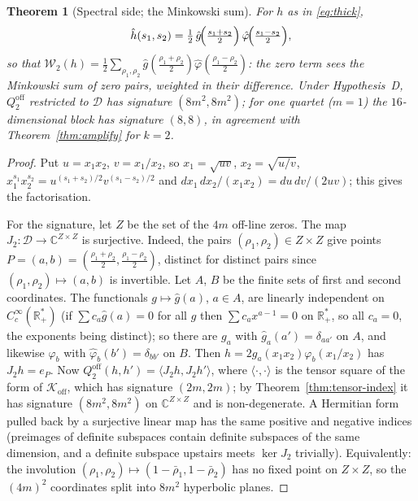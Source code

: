 \documentclass[11pt]{amsart}
\newtheorem{theorem}{Theorem}[section]
\theoremstyle{definition}
\theoremstyle{remark}
\newcommand{\bbR}{\mathbb{R}}
\newcommand{\bbC}{\mathbb{C}}
\newcommand{\Rp}{\bbR_+^*}
\newcommand{\Koff}{\mathcal{K}_{\mathrm{off}}}
\newcommand{\Wtwo}{\mathcal{W}_2}
\begin{document}
\begin{theorem}[Spectral side; the Minkowski sum]\label{thm:signature}
For $h$ as in \eqref{eq:thick},
\[
\hat h(s_1,s_2)=\tfrac12\,\hat g\!\Bigl(\tfrac{s_1+s_2}{2}\Bigr)\,
\hat\varphi\!\Bigl(\tfrac{s_1-s_2}{2}\Bigr),
\]
so that $\Wtwo(h)=\tfrac12\sum_{\rho_1,\rho_2}\hat g(\tfrac{\rho_1+\rho_2}{2})
\hat\varphi(\tfrac{\rho_1-\rho_2}{2})$: the zero term sees the Minkowski sum of zero pairs,
weighted in their difference. Under Hypothesis~D, $Q_2^{\mathrm{off}}$ restricted to
$\mathcal D$ has signature $(8m^2,8m^2)$; for one quartet ($m=1$) the $16$-dimensional block has
signature $(8,8)$, in agreement with Theorem~\ref{thm:amplify} for $k=2$.
\end{theorem}

\begin{proof}
Put $u=x_1x_2$, $v=x_1/x_2$, so $x_1=\sqrt{uv}$, $x_2=\sqrt{u/v}$,
$x_1^{s_1}x_2^{s_2}=u^{(s_1+s_2)/2}v^{(s_1-s_2)/2}$ and
$dx_1\,dx_2/(x_1x_2)=du\,dv/(2uv)$; this gives the factorisation.

For the signature, let $Z$ be the set of the $4m$ off-line zeros. The map $J_2:\mathcal
D\to\bbC^{Z\times Z}$ is surjective. Indeed, the pairs $(\rho_1,\rho_2)\in Z\times Z$ give points
$P=(a,b)=(\tfrac{\rho_1+\rho_2}{2},\tfrac{\rho_1-\rho_2}{2})$, distinct for distinct pairs since
$(\rho_1,\rho_2)\mapsto(a,b)$ is invertible. Let $A$, $B$ be the finite sets of first and second
coordinates. The functionals $g\mapsto\hat g(a)$, $a\in A$, are linearly independent on
$C_c^\infty(\Rp)$ (if $\sum c_a\hat g(a)=0$ for all $g$ then $\sum c_ax^{a-1}=0$ on $\Rp$, so
all $c_a=0$, the exponents being distinct); so there are $g_a$ with $\hat g_{a}(a')=\delta_{aa'}$
on $A$, and likewise $\varphi_b$ with $\hat\varphi_b(b')=\delta_{bb'}$ on $B$. Then
$h=2g_a(x_1x_2)\varphi_b(x_1/x_2)$ has $J_2h=e_{P}$. Now $Q_2^{\mathrm{off}}(h,h')=\langle
J_2h,J_2h'\rangle$, where $\langle\cdot,\cdot\rangle$ is the tensor square of the form of
$\Koff$, which has signature $(2m,2m)$; by Theorem~\ref{thm:tensor-index} it has signature
$(8m^2,8m^2)$ on $\bbC^{Z\times Z}$ and is non-degenerate. A Hermitian form pulled back by a
surjective linear map has the same positive and negative indices (preimages of definite
subspaces contain definite subspaces of the same dimension, and a definite subspace upstairs
meets $\ker J_2$ trivially). Equivalently: the involution
$(\rho_1,\rho_2)\mapsto(1-\bar\rho_1,1-\bar\rho_2)$ has no fixed point on $Z\times Z$, so the
$(4m)^2$ coordinates split into $8m^2$ hyperbolic planes.
\end{proof}
\end{document}
